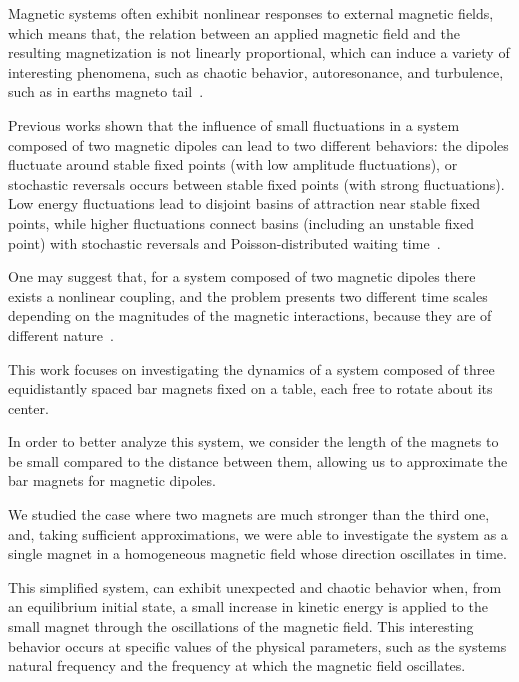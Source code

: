 Magnetic systems often exhibit nonlinear responses to external magnetic fields, which means that, the relation between an applied magnetic field and the resulting magnetization is not linearly proportional, which can induce a variety of interesting phenomena, such as chaotic behavior, autoresonance, and turbulence, such as in earth\textquotesingle s magneto tail~\cite{nonlinearResponse,Bratman1983,Loeb1986,VerandaM,Brunton2017,Chang1999}. 


Previous works shown that the influence of small fluctuations in a system composed of two magnetic dipoles can lead to two different behaviors: the dipoles fluctuate around stable fixed points (with low amplitude fluctuations), or stochastic reversals occurs between stable fixed points (with strong fluctuations). Low energy fluctuations lead to disjoint basins of attraction near stable fixed points, while higher fluctuations connect basins (including an unstable fixed point) with stochastic reversals and Poisson-distributed waiting time~\cite{santos2019dinamica, StochasticReversalDynamics}. 

One may suggest that, for a system composed of two magnetic dipoles there exists a nonlinear coupling, and the problem presents two different time scales depending on the magnitudes of the magnetic interactions, because they are of different nature~\cite{LAROZE20081440}.

This work focuses on investigating the dynamics of a system composed of three equidistantly spaced bar magnets fixed on a table, each free to rotate about its center. 

In order to better analyze this system, we consider the length of the magnets to be small compared to the distance between them, allowing us to approximate the bar magnets for magnetic dipoles.

We studied the case where two magnets are much stronger than the third one, and, taking sufficient approximations, we were able to investigate the system as a single magnet in a homogeneous magnetic field whose direction oscillates in time.

This simplified system, can exhibit unexpected and chaotic behavior when, from an equilibrium initial state, a small increase in kinetic energy is applied to the small magnet through the oscillations of the magnetic field. This interesting behavior occurs at specific values of the physical parameters, such as the system\textquotesingle s natural frequency and the frequency at which the magnetic field oscillates.

